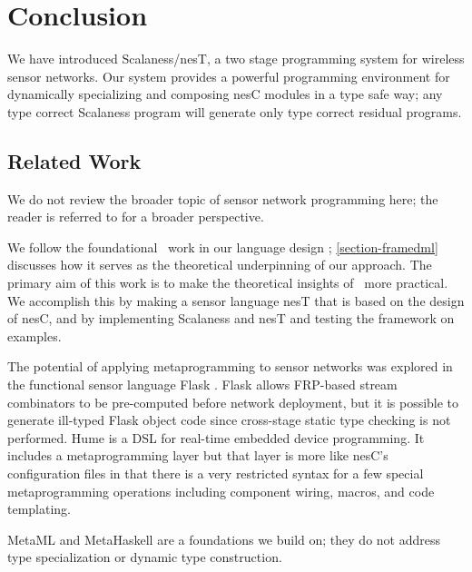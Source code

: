 \section{Conclusion}
\label{section-conclusion}

We have introduced Scalaness/nesT, a two stage programming system for wireless sensor networks.
Our system provides a powerful programming environment for dynamically specializing and
composing nesC modules in a type safe way; any type correct Scalaness program will generate only
type correct residual programs.

\subsection{Related Work}
We do not review the broader topic of sensor network programming here; the reader is referred to
\cite{Mottola:2011:PWS:1922649.1922656} for a broader perspective.

We follow the foundational \fml\ work in our language design \cite{FramedML};
\autoref{section-framedml} discusses how it serves as the theoretical underpinning of our
approach. The primary aim of this work is to make the theoretical insights of \fml\ more
practical. We accomplish this by making a sensor language nesT that is based on the design of
nesC, and by implementing Scalaness and nesT and testing the framework on examples.

The potential of applying metaprogramming to sensor networks was explored in the functional
sensor language Flask \cite{Mainland-Flask-2008}. Flask allows FRP-based stream combinators to
be pre-computed before network deployment, but it is possible to generate ill-typed Flask object
code since cross-stage static type checking is not performed. Hume \cite{Hume} is a DSL for
real-time embedded device programming. It includes a metaprogramming layer but that layer is
more like nesC's configuration files in that there is a very restricted syntax for a few special
metaprogramming operations including component wiring, macros, and code templating.

MetaML \cite{Taha-MetaML,DBLP:conf/icess/Taha04} and MetaHaskell
\cite{mainland12} 
are a foundations we build on; they do not address type specialization or dynamic type
construction.
%
%

